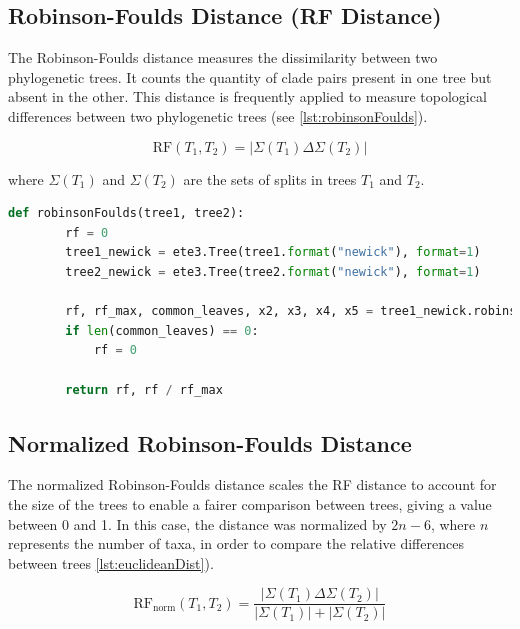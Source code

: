 \subsection{Robinson-Foulds Distance (RF Distance)}\label{RF}
The Robinson-Foulds distance measures the dissimilarity between two phylogenetic trees. It counts the quantity of clade pairs present in one tree but absent in the other. This distance is frequently applied to measure topological differences between two phylogenetic trees (see \autoref{lst:robinsonFoulds}).

\begin{equation}
    \text{RF}(T_1, T_2) = | \Sigma(T_1) \Delta \Sigma(T_2) |
\end{equation}

where $\Sigma(T_1)$ and $\Sigma(T_2)$ are the sets of splits in trees $T_1$ and $T_2$.

\begin{lstlisting}[label=lst:robinsonFoulds,language=Python,caption=Python script for calculating the Robinson-Foulds distance using the ete3 package in the aPhyloGeo package]
    def robinsonFoulds(tree1, tree2):
        rf = 0
        tree1_newick = ete3.Tree(tree1.format("newick"), format=1)
        tree2_newick = ete3.Tree(tree2.format("newick"), format=1)

        rf, rf_max, common_leaves, x2, x3, x4, x5 = tree1_newick.robinson_foulds(tree2_newick, unrooted_trees=True)
        if len(common_leaves) == 0:
            rf = 0

        return rf, rf / rf_max
\end{lstlisting}


\subsection{Normalized Robinson-Foulds Distance}\label{RFnorm}
The normalized Robinson-Foulds distance scales the RF distance to account for the size of the trees to enable a fairer comparison between trees, giving a value between 0 and 1. In this case, the distance was normalized by $2n-6$, where $n$ represents the number of taxa, in order to compare the relative differences between trees \autoref{lst:euclideanDist}).

\begin{equation}
    \text{RF}_{\text{norm}}(T_1, T_2) = \frac{| \Sigma(T_1) \Delta \Sigma(T_2) |}{| \Sigma(T_1) | + | \Sigma(T_2) |}
\end{equation}


